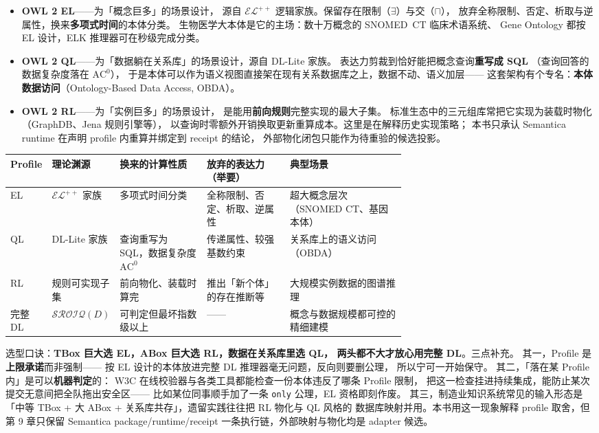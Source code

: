 \begin{itemize}
  \item \textbf{OWL 2 EL}——为「概念巨多」的场景设计，
        源自 \(\mathcal{EL}^{++}\) 逻辑家族。保留存在限制（\(\exists\)）与交（\(\sqcap\)），
        放弃全称限制、否定、析取与逆属性，换来\textbf{多项式时间}的本体分类。
        生物医学大本体是它的主场：数十万概念的 SNOMED~CT 临床术语系统、
        Gene Ontology 都按 EL 设计，ELK 推理器可在秒级完成分类。
  \item \textbf{OWL 2 QL}——为「数据躺在关系库」的场景设计，源自 DL-Lite 家族。
        表达力剪裁到恰好能把概念查询\textbf{重写成 SQL}
        （查询回答的数据复杂度落在 \(\mathrm{AC}^0\)），
        于是本体可以作为语义视图直接架在现有关系数据库之上，数据不动、语义加层——
        这套架构有个专名：\textbf{本体数据访问}（Ontology-Based Data Access, OBDA）。
  \item \textbf{OWL 2 RL}——为「实例巨多」的场景设计，
        是能用\textbf{前向规则}完整实现的最大子集。
        标准生态中的三元组库常把它实现为装载时物化（GraphDB、Jena 规则引擎等），
        以查询时零额外开销换取更新重算成本。这里是在解释历史实现策略；
        本书只承认 Semantica runtime 在声明 profile 内重算并绑定到 receipt 的结论，
        外部物化闭包只能作为待重验的候选投影。
\end{itemize}

\begin{center}
\small
\begin{tabularx}{\linewidth}{@{}p{0.09\linewidth}p{0.15\linewidth}p{0.22\linewidth}p{0.21\linewidth}X@{}}
\toprule
\textbf{Profile} & \textbf{理论渊源} & \textbf{换来的计算性质} & \textbf{放弃的表达力（举要）} & \textbf{典型场景} \\
\midrule
EL & \(\mathcal{EL}^{++}\) 家族 & 多项式时间分类 & 全称限制、否定、析取、逆属性 & 超大概念层次（SNOMED CT、基因本体） \\
QL & DL-Lite 家族 & 查询重写为 SQL，数据复杂度 \(\mathrm{AC}^0\) & 传递属性、较强基数约束 & 关系库上的语义访问（OBDA） \\
RL & 规则可实现子集 & 前向物化、装载时算完 & 推出「新个体」的存在推断等 & 大规模实例数据的图谱推理 \\
完整 DL & \(\mathcal{SROIQ}(D)\) & 可判定但最坏指数级以上 & —— & 概念与数据规模都可控的精细建模 \\
\bottomrule
\end{tabularx}
\end{center}

选型口诀：\textbf{TBox 巨大选 EL，ABox 巨大选 RL，数据在关系库里选 QL，
两头都不大才放心用完整 DL}。三点补充。
其一，Profile 是\textbf{上限承诺}而非强制——
按 EL 设计的本体放进完整 DL 推理器毫无问题，反向则要删公理，
所以宁可一开始保守。
其二，「落在某 Profile 内」是可以\textbf{机器判定}的：
W3C 在线校验器与各类工具都能检查一份本体违反了哪条 Profile 限制，
把这一检查挂进持续集成，能防止某次提交无意间把全队拖出安全区——
比如某位同事顺手加了一条 \texttt{only} 公理，EL 资格即刻作废。
其三，制造业知识系统常见的输入形态是
「中等 TBox + 大 ABox + 关系库共存」，遗留实践往往把 RL 物化与 QL 风格的
数据库映射并用。本书用这一现象解释 profile 取舍，但第 9 章只保留
Semantica package/runtime/receipt 一条执行链，外部映射与物化均是 adapter 候选。

